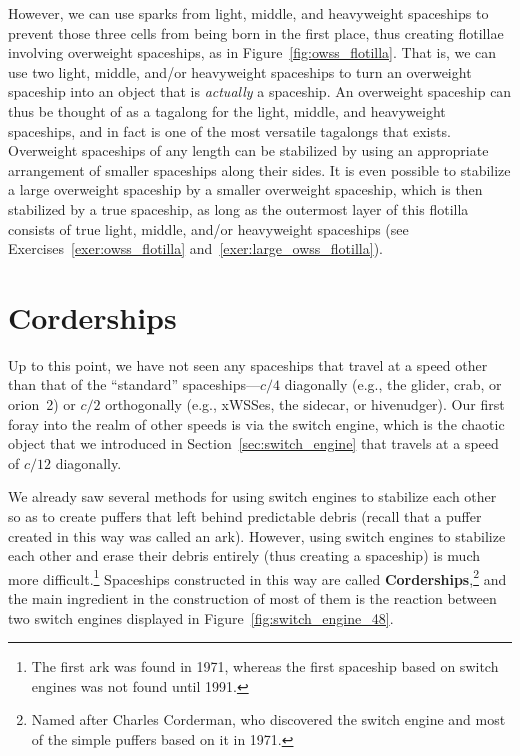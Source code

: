 However, we can use sparks from light, middle, and heavyweight spaceships to prevent those three cells from being born in the first place, thus creating flotillae involving overweight spaceships, as in Figure~\ref{fig:owss_flotilla}. That is, we can use two light, middle, and/or heavyweight spaceships to turn an overweight spaceship into an object that is \emph{actually} a spaceship. An overweight spaceship can thus be thought of as a tagalong for the light, middle, and heavyweight spaceships, and in fact is one of the most versatile tagalongs that exists. Overweight spaceships of any length can be stabilized by using an appropriate arrangement of smaller spaceships along their sides. It is even possible to stabilize a large overweight spaceship by a smaller overweight spaceship, which is then stabilized by a true spaceship, as long as the outermost layer of this flotilla consists of true light, middle, and/or heavyweight spaceships (see Exercises~\ref{exer:owss_flotilla} and~\ref{exer:large_owss_flotilla}).



\section{Corderships}\label{sec:corderships}

Up to this point, we have not seen any spaceships that travel at a speed other than that of the ``standard'' spaceships---$c/4$ diagonally (e.g., the glider, crab, or orion~2) or $c/2$ orthogonally (e.g., xWSSes, the sidecar, or hivenudger). Our first foray into the realm of other speeds is via the switch engine, which is the chaotic object that we introduced in Section~\ref{sec:switch_engine} that travels at a speed of $c/12$ diagonally.

We already saw several methods for using switch engines to stabilize each other so as to create puffers that left behind predictable debris (recall that a puffer created in this way was called an ark). However, using switch engines to stabilize each other and erase their debris entirely (thus creating a spaceship) is much more difficult.\footnote{The first ark was found in 1971, whereas the first spaceship based on switch engines was not found until 1991.} Spaceships constructed in this way are called \textbf{Corderships},\footnote{Named after Charles Corderman, who discovered the switch engine and most of the simple puffers based on it in 1971.} and the main ingredient in the construction of most of them is the reaction between two switch engines displayed in Figure~\ref{fig:switch_engine_48}.

